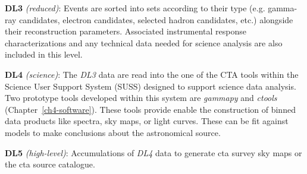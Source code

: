 \textbf{DL3} \textit{(reduced)}:
Events are sorted into sets according to their type (e.g. gamma-ray candidates, electron candidates, selected hadron
candidates, etc.) alongside their reconstruction parameters. Associated instrumental response characterizations and any technical data needed for
science analysis are also included in this level.

\textbf{DL4} \textit{(science)}:
The \textit{DL3} data are read into the one of  the CTA tools within the Science User Support System (SUSS) designed to support science data analysis. Two prototype tools developed within this system are \textit{gammapy} and \textit{ctools} (Chapter~\ref{ch4-software}). These tools provide enable the construction of binned data products like spectra, sky maps, or light curves. These can be fit against models to make conclusions about the astronomical source.

\textbf{DL5} \textit{(high-level)}:
Accumulations of \textit{DL4} data to generate \gls{cta} survey sky maps or the \gls{cta}
source catalogue.